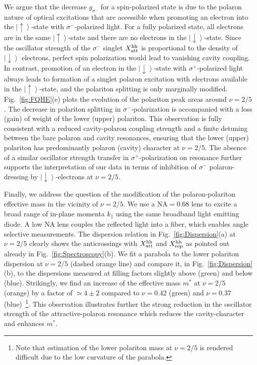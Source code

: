 \documentclass[prl,twocolumn,10pt,showpacs,superscriptaddress,longbibliography,footnoteinbib]{revtex4-1}
\begin{document}
We argue that the decrease $g_{\sigma^-}$ for a spin-polarized state is due to the polaron nature of optical excitations that are accessible when promoting an electron into the $\left | \uparrow \right >$-state with $\sigma^-$-polarized light. For a fully polarized state, all electrons are in the same $\left | \uparrow \right >$-state and there are no electrons in the $\left | \downarrow \right >$-state. Since the oscillator strength of the $\sigma^-$ singlet $X^{\rm hh}_{\rm att}$ is proportional to the density of $\left | \downarrow \right >$ electrons, perfect spin polarization would lead to vanishing cavity coupling. In contrast, promotion of an electron in the $\left | \downarrow \right >$-state with $\sigma^+$-polarized light always leads to formation of a singlet polaron excitation with electrons available in the $\left | \uparrow \right >$-state, and the polariton splitting is only marginally modified. Fig.~\ref{fig:FQHE}(e) plots the evolution of the polariton peak areas around $\nu=2/5$. The decrease in polariton splitting in $\sigma^-$-polarization is accompanied with a loss (gain) of weight of the lower (upper) polariton. This observation is fully consistent with a reduced cavity-polaron coupling strength and a finite detuning between the bare polaron and cavity resonances, ensuring that the lower (upper) polariton has predominantly polaron (cavity) character at $\nu=2/5$. The absence of a similar oscillator strength transfer in $\sigma^+$-polarization on resonance further supports the interpretation of our data in terms of inhibition of $\sigma^-$ polaron-dressing by $\left | \downarrow \right >$-electrons at $\nu=2/5$.

Finally, we address the question of the modification of the polaron-polariton effective mass in the vicinity of $\nu=2/5$. We use a $\mathrm{NA}= 0.68$ lens to excite a broad range of in-plane momenta $k_{\parallel}$ using the same broadband light emitting diode. A low NA lens couples the reflected light into a fiber, which enables angle selective measurements. The dispersion relation in Fig.~\ref{fig:Dispersion}(a) at $\nu=2/5$ clearly shows the anticrossings with $X^{\rm hh}_{\rm att}$ and $X^{\rm hh}_{\rm rep}$ as pointed out already in Fig.~\ref{fig:Spectroscopy}(b). We fit a parabola to the lower polariton dispersion at $\nu=2/5$ (dashed orange line) and compare it, in Fig.~\ref{fig:Dispersion}(b), to the dispersions measured at filling factors slightly above (green) and below (blue). Strikingly, we find an increase of the effective mass $m^*$ at $\nu=2/5$ (orange) by a factor of $\simeq 4 \pm 2$ compared to $\nu=0.42$ (green) and $\nu=0.37$ (blue)~\footnote{Note that estimation of the lower polariton mass at $\nu = 2/5$ is rendered difficult due to the low curvature of the parabola.}. This observation illustrates further the strong reduction in the oscillator strength of the attractive-polaron resonance which reduces the cavity-character and enhances $m^*$.
\end{document}
